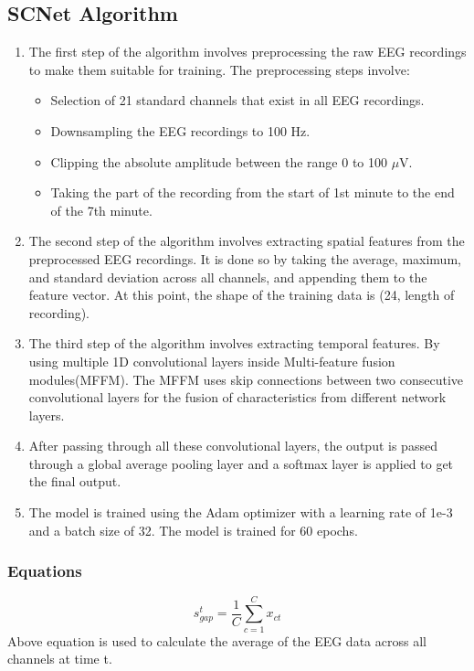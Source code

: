 \documentclass[10pt]{article}
\begin{document}
\subsection{SCNet Algorithm} 
\begin{enumerate}
  \item The first step of the algorithm involves preprocessing the raw EEG recordings to make them suitable for training. The preprocessing steps involve:
  \begin{itemize}
    \item Selection of 21 standard channels that exist in all EEG recordings.
    \item Downsampling the EEG recordings to 100 Hz.
    \item Clipping the absolute amplitude between the range 0 to 100 $\mu$V.
    \item Taking the part of the recording from the start of 1st minute to the end of the 7th minute.
  \end{itemize}
  \item The second step of the algorithm involves extracting spatial features from the preprocessed EEG recordings. It is done so by taking the average, maximum, and standard deviation across all channels, and appending them to the feature vector. At this point, the shape of the training data is (24, length of recording).
  \item The third step of the algorithm involves extracting temporal features. By using multiple 1D convolutional layers inside Multi-feature fusion modules(MFFM). The MFFM uses skip connections between two consecutive convolutional layers for the fusion of characteristics from different network layers.
  \item After passing through all these convolutional layers, the output is passed through a global average pooling layer and a softmax layer is applied to get the final output.
  \item The model is trained using the Adam optimizer with a learning rate of 1e-3 and a batch size of 32. The model is trained for 60 epochs.
\end{enumerate}

\subsubsection{Equations}
\[ s_{gap}^t = \frac{1}{C} \sum_{c=1}^{C} x_{ct} \]
Above equation is used to calculate the average of the EEG data across all channels at time t.
\end{document}
